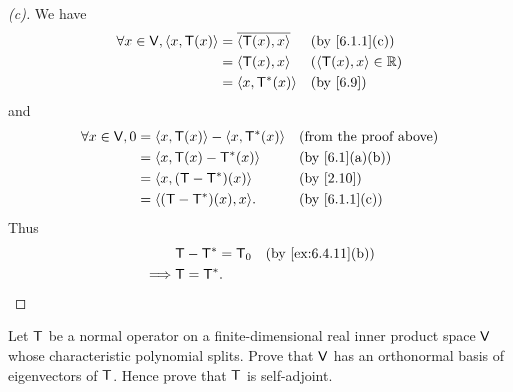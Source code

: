 \begin{proof}[(c)]
  We have
  \begin{align*}
    \forall x \in \V, \inn{x, \T(x)} & = \conj{\inn{\T(x), x}} &  & \by{6.1.1}[c]           \\
                                     & = \inn{\T(x), x}        &  & (\inn{\T(x), x} \in \R) \\
                                     & = \inn{x, \T^*(x)}      &  & \by{6.9}
  \end{align*}
  and
  \begin{align*}
    \forall x \in \V, 0 & = \inn{x, \T(x)} - \inn{x, \T^*(x)} &  & \text{(from the proof above)} \\
                        & = \inn{x, \T(x) - \T^*(x)}          &  & \by{6.1}[a,b]                 \\
                        & = \inn{x, (\T - \T^*)(x)}           &  & \by{2.10}                     \\
                        & = \inn{(\T - \T^*)(x), x}.          &  & \by{6.1.1}[c]
  \end{align*}
  Thus
  \begin{align*}
             & \T - \T^* = \zT &  & \by{ex:6.4.11}[b] \\
    \implies & \T = \T^*.
  \end{align*}
\end{proof}

\begin{ex}\label{ex:6.4.12}
  Let \(\mathsf{T}\) be a normal operator on a finite-dimensional real inner product space \(\mathsf{V}\) whose characteristic polynomial splits.
  Prove that \(\mathsf{V}\) has an orthonormal basis of eigenvectors of \(\mathsf{T}\).
  Hence prove that \(\mathsf{T}\) is self-adjoint.
\end{ex}

